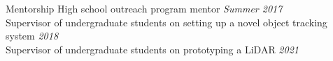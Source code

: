 \begin{rSection}{Mentorship}
{High school outreach program mentor} \hfill {\em Summer 2017}\\
{Supervisor of undergraduate students on setting up a novel object tracking system} \hfill {\em 2018}\\
{Supervisor of undergraduate students on prototyping a LiDAR} \hfill {\em 2021}
\end{rSection}